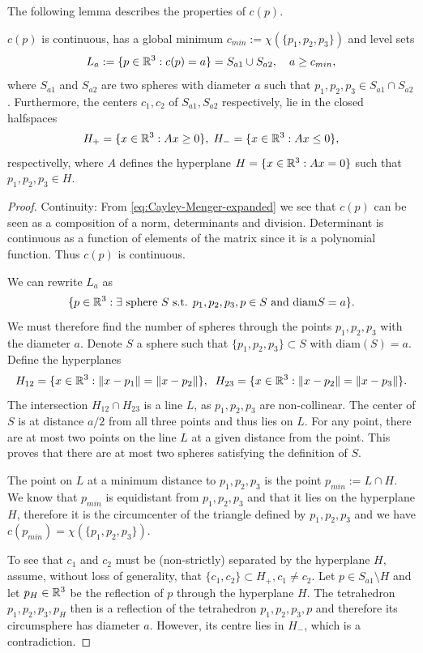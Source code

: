 The following lemma describes the properties of $c(p)$.

\begin{lemma} $c(p)$ is continuous, has a global minimum $c_{min} := \chi(\{p_1,p_2,p_3\})$ and level sets 
	$$L_a := \{p \in {\mathbb R^3}: c(p)=a\} = S_{a1} \cup S_{a2}, \quad a \geq c_{min},$$ 
	where $S_{a1}$ and $S_{a2}$ are two spheres with diameter $a$ such that $p_1,p_2,p_3 \in S_{a1}\cap S_{a2}$. Furthermore, the centers $c_1, c_2$ of $S_{a1},S_{a2}$ respectively, lie in the closed halfspaces
$$H_+ = \{x \in {\mathbb R^3}: Ax \geq 0 \},\; H_- = \{x \in {\mathbb R^3}: Ax \leq 0\},$$
respectivelly, where $A$ defines the hyperplane $H=\{x\in{\mathbb R^3}: Ax = 0\}$ such that $p_1,p_2,p_3\in H$. 
\end{lemma}
\begin{proof}
	Continuity: From \ref{eq:Cayley-Menger-expanded} we see that $c(p)$ can be seen as a composition of a norm, determinants and division. Determinant is continuous as a function of elements of the matrix since it is a polynomial function. Thus $c(p)$ is continuous.\newline

\noindent We can rewrite $L_a$ as
$$\{p \in {\mathbb R^3}: \exists \text{ sphere } S \text{ s.t. } p_1,p_2,p_3,p \in S \text{ and diam}S = a\}.$$
We must therefore find the number of spheres through the points $p_1,p_2,p_3$ with the diameter $a$. Denote $S$ a sphere such that $\{p_1,p_2,p_3\}\subset S$ with \mbox{$\mathrm{diam}(S)=a$}. Define the hyperplanes
$$H_{12} = \{x\in{\mathbb R^3}: \|x-p_1\| = \|x-p_2\|\}, \;\; H_{23} = \{x\in{\mathbb R^3}: \|x-p_2\|=\|x-p_3\|\}.$$
The intersection $H_{12}\cap H_{23}$ is a line $L$, as $p_1,p_2,p_3$ are non-collinear.  The center of $S$ is at distance $a/2$ from all three points and thus lies on $L$. For any point, there are at most two points on the line $L$ at a given distance from the point. This proves that there are at most two spheres satisfying the definition of $S$.

The point on $L$ at a minimum distance to $p_1,p_2,p_3$ is the point $p_{min}:=L\cap H$. We know that $p_{min}$ is equidistant from $p_1,p_2,p_3$ and that it lies on the hyperplane $H$, therefore it is the circumcenter of the triangle defined by $p_1,p_2,p_3$ and we have $c(p_{min}) = \chi(\{p_1,p_2,p_3\})$.  

To see that $c_1$ and $c_2$ must be (non-strictly) separated by the hyperplane $H$, assume, without loss of generality, that $\{c_1,c_2\}\subset H_+, c_1\neq c_2$. Let $p \in S_{a1}\setminus H$ and let  \mbox{$p_H\in {\mathbb R^3}$} be the reflection of $p$ through the hyperplane $H$. The tetrahedron $p_1,p_2,p_3,p_H$ then is a reflection of the tetrahedron $p_1,p_2,p_3, p$ and therefore its circumsphere has diameter $a$. However, its centre lies in $H_-$, which is a contradiction. 
\end{proof}

